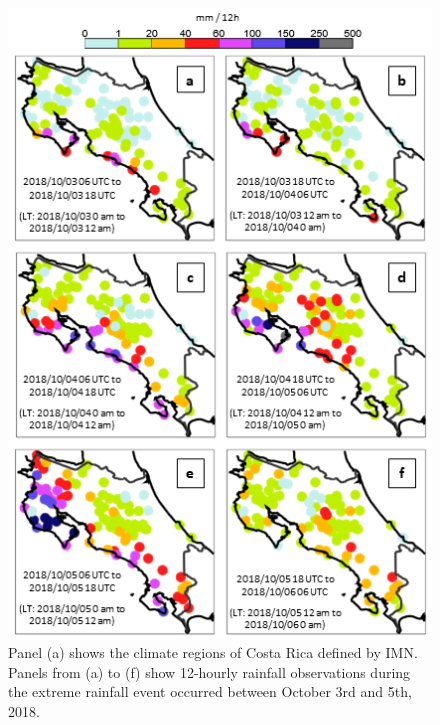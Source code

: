 \documentclass[twocol]{ametsocV5} %
\begin{document}
\begin{figure}
\centerline{\includegraphics[width=39pc]{manuscript/Figures/Results_Obs_CaseStudy_CR.png}}
\caption{Panel (a) shows the climate regions of Costa Rica defined by IMN. Panels from (a) to (f) show 12-hourly rainfall observations during the extreme rainfall event occurred between October 3rd and 5th, 2018.}
\label{Obs_CaseStudy_CR}
\end{figure}
\end{document}

